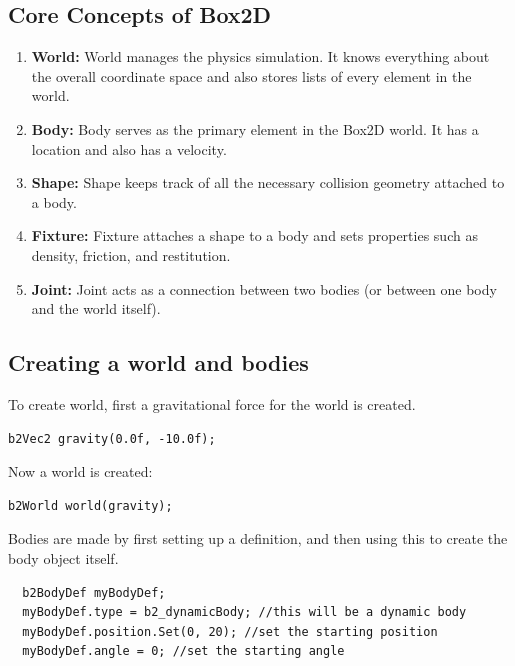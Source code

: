 \documentclass[main]{subfiles}
\begin{document}
\subsection{Core Concepts of Box2D}
\begin{enumerate}
  \item \textbf{World:} World manages the physics simulation. It knows everything about the overall coordinate space and also stores lists of every element in the world.
  
  \item \textbf{Body:} Body serves as the primary element in the Box2D world. It has a location and also has a velocity.
  
  \item \textbf{Shape:} Shape keeps track of all the necessary collision geometry attached to a body.
  
  \item \textbf{Fixture:} Fixture attaches a shape to a body and sets properties such as density, friction, and restitution.
  
  \item \textbf{Joint:} Joint acts as a connection between two bodies (or between one body and the world itself).
\end{enumerate}


\subsection{Creating a world and bodies}
To create world, first  a gravitational force for the world is created.

\begin{verbatim}
b2Vec2 gravity(0.0f, -10.0f);
\end{verbatim}

Now  a world is created:
\begin{verbatim}
b2World world(gravity);
\end{verbatim}

Bodies are made by first setting up a definition, and then using this to create the body object itself.
\begin{verbatim}
  b2BodyDef myBodyDef; 
  myBodyDef.type = b2_dynamicBody; //this will be a dynamic body
  myBodyDef.position.Set(0, 20); //set the starting position
  myBodyDef.angle = 0; //set the starting angle
\end{verbatim}

\newpage
\end{document}
